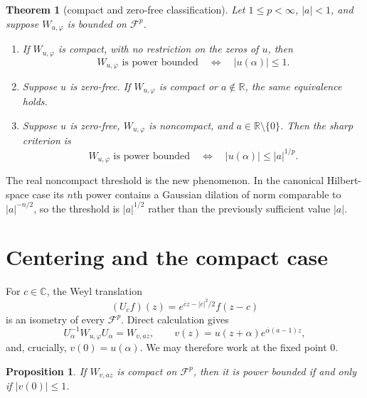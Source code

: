\documentclass[11pt]{article}
\newtheorem{theorem}{Theorem}
\newtheorem{proposition}{Proposition}
\newcommand{\C}{\mathbb C}
\newcommand{\F}{\mathcal F}
\newcommand{\alphaDW}{\alpha}
\begin{document}
\begin{theorem}[compact and zero-free classification]\label{thm:main}
Let $1\le p<\infty$, $|a|<1$, and suppose $W_{u,\varphi}$ is bounded on
$\F^p$.

\begin{enumerate}
\item If $W_{u,\varphi}$ is compact, with no restriction on the zeros of
      $u$, then
      \[
       W_{u,\varphi}\text{ is power bounded}
       \quad\Longleftrightarrow\quad |u(\alphaDW)|\le1.
      \]
\item Suppose $u$ is zero-free.  If $W_{u,\varphi}$ is compact or
      $a\notin\mathbb R$, the same equivalence holds.
\item Suppose $u$ is zero-free, $W_{u,\varphi}$ is noncompact, and
      $a\in\mathbb R\setminus\{0\}$.  Then the sharp criterion is
      \[
       W_{u,\varphi}\text{ is power bounded}
       \quad\Longleftrightarrow\quad
       |u(\alphaDW)|\le |a|^{1/p}.
      \]
\end{enumerate}
\end{theorem}

The real noncompact threshold is the new phenomenon.  In the canonical
Hilbert-space case its $n$th power contains a Gaussian dilation of norm
comparable to $|a|^{-n/2}$, so the threshold is $|a|^{1/2}$ rather than the
previously sufficient value $|a|$.

\section{Centering and the compact case}

For $c\in\C$, the Weyl translation
\[
 (U_cf)(z)=e^{\overline c z-|c|^2/2}f(z-c)
\]
is an isometry of every $\F^p$.  Direct calculation gives
\[
 U_{\alphaDW}^{-1}W_{u,\varphi}U_{\alphaDW}=W_{v,az},
 \qquad
 v(z)=u(z+\alphaDW)e^{\overline{\alphaDW}(a-1)z},
 \tag{1}\label{eq:center}
\]
and, crucially, $v(0)=u(\alphaDW)$.  We may therefore work at the fixed
point $0$.

\begin{proposition}\label{prop:compact}
If $W_{v,az}$ is compact on $\F^p$, then it is power bounded if and only if
$|v(0)|\le1$.
\end{proposition}
\end{document}

